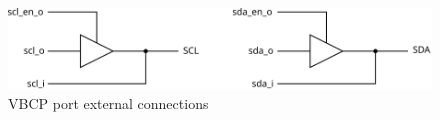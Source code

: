 \documentclass[a4paper,11pt]{article}
\begin{document}
\begin{figure}[h]
  \centerline{\includegraphics[width=.75\textwidth]{fig/i2c-ports}}
  \caption{VBCP port external connections}
  \label{fig:i2c-ports}
\end{figure}

\end{document}
